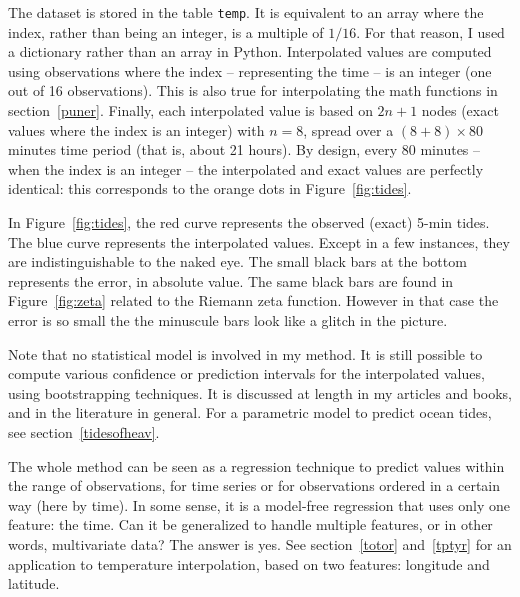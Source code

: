 \documentclass[oneside,10pt]{book}
\begin{document}
\noindent The dataset is stored in the table \texttt{temp}. It is equivalent to an array where the index, rather than being an integer, is a multiple of $1/16$. For that reason, I used a dictionary rather than an array in Python. Interpolated values are computed using observations where the index -- representing the time -- is an integer (one out of 16 observations). This is also true for interpolating the math functions in section~\ref{puner}. Finally, each interpolated value is based on $2n + 1$ nodes (exact values where the index is an integer) with $n=8$, spread over a
$(8 + 8)\times 80$ minutes time period (that is, about 21 hours). By design, every 80 minutes -- when the index is an integer -- the interpolated and exact values are perfectly identical: this corresponds to the orange dots in Figure~\ref{fig:tides}.

In Figure~\ref{fig:tides}, the red curve represents the observed (exact) 5-min tides.
The blue curve represents the interpolated values. Except in a few instances, they are indistinguishable to the naked eye. The small black bars at the bottom represents the error, in absolute value. The same black bars are found in Figure~\ref{fig:zeta} related to the Riemann zeta function. However in that case the error is so small the the minuscule bars look like a glitch in the picture.

Note that no statistical model is involved in my method. It is still possible to compute various confidence or prediction intervals for the
 interpolated values, using bootstrapping techniques. It is discussed at length in my articles and books, and in the literature in general.
For a parametric model to predict ocean tides, see
 section~\ref{tidesofheav}.

The whole method can be seen as a regression technique to predict values within the range of observations, for time series or for
 observations ordered in a certain way (here by time). In some sense, it is a model-free regression that
uses only one feature: the time. Can it be generalized to handle multiple features, or in other words, multivariate data? The answer is yes. See section~\ref{totor} and~\ref{tptyr} for an application to temperature interpolation, based on two features: longitude and latitude.
\end{document}
